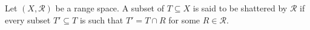 \begin{definition}
	Let \((X, \mathcal{R})\) be a range space. A subset of \(T \subseteq X\) is
	said to be shattered by \(\mathcal{R}\) if every subset \(T' \subseteq
	T \) is such that \(T' = T \cap R\) for some \(R \in \mathcal{R}\).
\end{definition}
